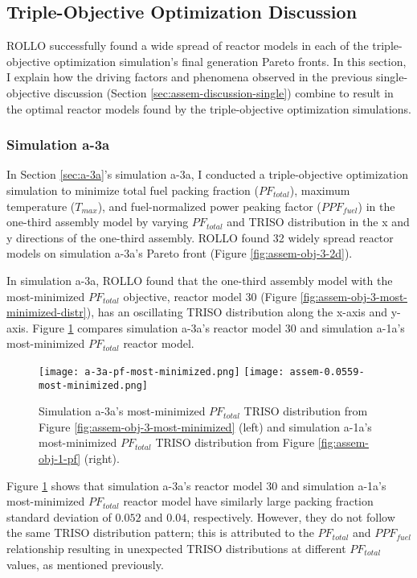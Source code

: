 \subsection{Triple-Objective Optimization Discussion}
\label{sec:assem-discussion-triple}
\gls{ROLLO} successfully found a wide spread of reactor models in each of the 
triple-objective optimization simulation's final generation Pareto fronts.
In this section, I explain how the driving factors and phenomena observed in 
the previous single-objective discussion (Section \ref{sec:assem-discussion-single}) 
combine to result in the optimal reactor models found by the triple-objective 
optimization simulations. 

\subsubsection{Simulation a-3a}
In Section \ref{sec:a-3a}'s simulation a-3a, I conducted a triple-objective 
optimization simulation to minimize total fuel packing fraction ($PF_{total}$), 
maximum temperature ($T_{max}$), and fuel-normalized power peaking factor 
($PPF_{fuel}$) in the one-third assembly model by varying $PF_{total}$ and 
TRISO distribution in the x and y directions of the one-third assembly.
\gls{ROLLO} found 32 widely spread reactor models on simulation a-3a's Pareto 
front (Figure \ref{fig:assem-obj-3-2d}). 

In simulation a-3a, \gls{ROLLO} found that the one-third assembly model with the 
most-minimized $PF_{total}$ objective, reactor model 30 (Figure 
\ref{fig:assem-obj-3-most-minimized-distr}), has an oscillating TRISO distribution 
along the x-axis and y-axis. 
Figure \ref{fig:a-3a-pf-triso-comparison} compares simulation a-3a's reactor model 30 and 
simulation a-1a's most-minimized $PF_{total}$ reactor model. 
\begin{figure}[htbp!]
    \centering
    \texttt{[image: a-3a-pf-most-minimized.png]} 
    \texttt{[image: assem-0.0559-most-minimized.png]} 
    \caption{Simulation a-3a's most-minimized $PF_{total}$ TRISO distribution 
    from Figure \ref{fig:assem-obj-3-most-minimized} (left) and simulation a-1a's 
    most-minimized $PF_{total}$ TRISO distribution from Figure 
    \ref{fig:assem-obj-1-pf} (right).}
    \label{fig:a-3a-pf-triso-comparison}
\end{figure}
Figure \ref{fig:a-3a-pf-triso-comparison} shows that simulation a-3a's reactor model 30 
and simulation a-1a's most-minimized $PF_{total}$ reactor model have similarly large 
packing fraction standard deviation of $0.052$ and $0.04$, respectively. 
However, they do not follow the same TRISO distribution pattern; this is 
attributed to the $PF_{total}$ and $PPF_{fuel}$ relationship resulting in unexpected 
TRISO distributions at different $PF_{total}$ values, as mentioned previously. 

